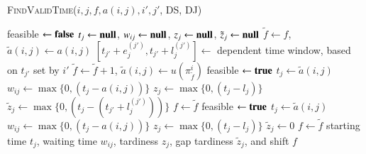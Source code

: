 \documentclass[a4paper,11pt,authoryear]{elsarticle}
\begin{document}
\begin{algorithm}[htbp!]
\caption{\textsc{FindValidTime}($i, j, f, a(i,j), i', j'$, DS, DJ)}
\label{alg:fvt}
\begin{algorithmic}[1]
	\State feasible $\gets \textbf{false}$
	\State $t_j \gets \textbf{null}$, $w_{ij} \gets \textbf{null}$, $z_j \gets \textbf{null}$, $\tilde{z}_j \gets \textbf{null}$
	\State $\tilde{f} \gets f$, $\tilde{a}(i,j) \gets a(i,j)$
		\State $[t_{j'} + e_j^{(j')}, t_{j'} + l_j^{(j')}] \gets$ dependent time window, based on $t_{j'}$ set by $i'$
	\EndIf
		\State $\tilde{f} \gets \tilde{f}+1$, $\tilde{a}(i,j) \gets u(\pi_{\tilde{f}}^{i})$
				\Continue
			\Else
				\State feasible $\gets \textbf{true}$
				\State $t_j \gets \tilde{a}(i,j)$
				\State $w_{ij} \gets \max\{0, (t_j - a(i,j))\}$
				\State $z_j \gets \max\{0, (t_j - l_j)\}$
				\State $\tilde{z}_j \gets \max\{0, (t_j - (t_{j'} + l_j^{(j')}))\}$
				\State $f \gets \tilde{f}$
			\EndIf
		\Else
				\Continue
			\Else
				\State feasible $\gets \textbf{true}$
				\State $t_j \gets \tilde{a}(i,j)$
				\State $w_{ij} \gets \max\{0, (t_j - a(i,j))\}$
				\State $z_j \gets \max\{0, (t_j - l_j)\}$
				\State $\tilde{z}_j \gets 0$
				\State $f \gets \tilde{f}$
			\EndIf
		\EndIf
	\EndWhile
	\Return starting time $t_j$, waiting time $w_{ij}$, tardiness $z_j$, gap tardiness $\tilde{z}_j$, and shift $f$
\end{algorithmic}
\end{algorithm}
\end{document}
